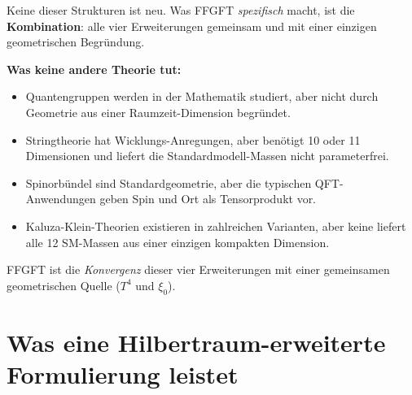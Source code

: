 \begin{center}
\renewcommand{\arraystretch}{1.4}
{\small
{}
}
\renewcommand{\arraystretch}{1.0}
\end{center}

Keine dieser Strukturen ist neu. Was FFGFT \emph{spezifisch} macht,
ist die \textbf{Kombination}: alle vier Erweiterungen gemeinsam und
mit einer einzigen geometrischen Begründung.

\textbf{Was keine andere Theorie tut:}
\begin{itemize}[leftmargin=2em,itemsep=2pt,topsep=2pt]
  \item Quantengruppen werden in der Mathematik studiert, aber nicht
        durch Geometrie aus einer Raumzeit-Dimension begründet.
  \item Stringtheorie hat Wicklungs-Anregungen, aber benötigt 10 oder
        11 Dimensionen und liefert die Standardmodell-Massen nicht
        parameterfrei.
  \item Spinorbündel sind Standardgeometrie, aber die typischen QFT-
        Anwendungen geben Spin und Ort als Tensorprodukt vor.
  \item Kaluza-Klein-Theorien existieren in zahlreichen Varianten,
        aber keine liefert alle 12 SM-Massen aus einer einzigen
        kompakten Dimension.
\end{itemize}

FFGFT ist die \emph{Konvergenz} dieser vier Erweiterungen mit einer
gemeinsamen geometrischen Quelle ($T^4$ und $\xi_0$).

\section{Was eine Hilbertraum-erweiterte Formulierung leistet}

